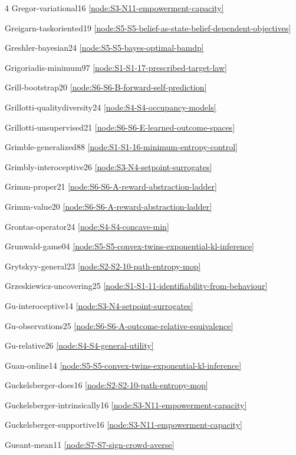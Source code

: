 \documentclass[10pt]{article}
\begin{document}
{\begin{multicols}{4}
Gregor-variational16 \hfill \ref{node:S3-N11-empowerment-capacity}\par
Greigarn-taskoriented19 \hfill \ref{node:S5-S5-belief-as-state-belief-dependent-objectives}\par
Greshler-bayesian24 \hfill \ref{node:S5-S5-bayes-optimal-bamdp}\par
Grigoriadis-minimum97 \hfill \ref{node:S1-S1-17-prescribed-target-law}\par
Grill-bootstrap20 \hfill \ref{node:S6-S6-B-forward-self-prediction}\par
Grillotti-qualitydiversity24 \hfill \ref{node:S4-S4-occupancy-models}\par
Grillotti-unsupervised21 \hfill \ref{node:S6-S6-E-learned-outcome-spaces}\par
Grimble-generalized88 \hfill \ref{node:S1-S1-16-minimum-entropy-control}\par
Grimbly-interoceptive26 \hfill \ref{node:S3-N4-setpoint-surrogates}\par
Grimm-proper21 \hfill \ref{node:S6-S6-A-reward-abstraction-ladder}\par
Grimm-value20 \hfill \ref{node:S6-S6-A-reward-abstraction-ladder}\par
Grontas-operator24 \hfill \ref{node:S4-S4-concave-min}\par
Grunwald-game04 \hfill \ref{node:S5-S5-convex-twins-exponential-kl-inference}\par
Grytskyy-general23 \hfill \ref{node:S2-S2-10-path-entropy-mop}\par
Grzeskiewicz-uncovering25 \hfill \ref{node:S1-S1-11-identifiability-from-behaviour}\par
Gu-interoceptive14 \hfill \ref{node:S3-N4-setpoint-surrogates}\par
Gu-observations25 \hfill \ref{node:S6-S6-A-outcome-relative-equivalence}\par
Gu-relative26 \hfill \ref{node:S4-S4-general-utility}\par
Guan-online14 \hfill \ref{node:S5-S5-convex-twins-exponential-kl-inference}\par
Guckelsberger-does16 \hfill \ref{node:S2-S2-10-path-entropy-mop}\par
Guckelsberger-intrinsically16 \hfill \ref{node:S3-N11-empowerment-capacity}\par
Guckelsberger-supportive16 \hfill \ref{node:S3-N11-empowerment-capacity}\par
Gueant-mean11 \hfill \ref{node:S7-S7-sign-crowd-averse}\par

\end{multicols}}
\end{document}
